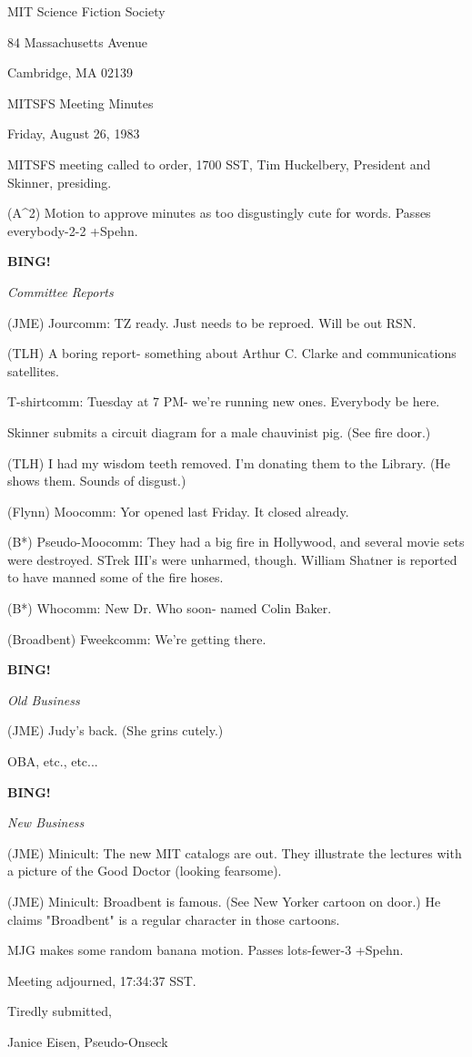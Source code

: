 \documentclass[12pt]{article}
\newcommand{\bing}{{\bf BING!} }
\newcommand{\goto}[1]{\bing \vskip 12pt \centerline{{\em{#1}}}}
\begin{document}
\begin{center}

MIT Science Fiction Society 

84 Massachusetts Avenue

Cambridge, MA 02139

\vspace{12pt}

MITSFS Meeting Minutes 

Friday, August 26, 1983

\end{center}
 
\vspace{18pt}

\setlength{\parskip}{6pt}

\noindent
MITSFS meeting called to order, 1700 SST,
Tim Huckelbery, President and Skinner, presiding.

(A^2) Motion to approve minutes as too disgustingly cute for words. Passes everybody-2-2 +Spehn.

\goto{Committee Reports}

(JME) Jourcomm: TZ ready. Just needs to be reproed. Will be out RSN.

(TLH) A boring report- something about Arthur C. Clarke and communications satellites.

T-shirtcomm: Tuesday at 7 PM- we're running new ones. Everybody be here.

Skinner submits a circuit diagram for a male chauvinist pig. (See fire door.)

(TLH) I had my wisdom teeth removed. I'm donating them to the Library. (He shows them. Sounds of disgust.)

(Flynn) Moocomm: Yor opened last Friday. It closed already.

(B*) Pseudo-Moocomm: They had a big fire in Hollywood, and several movie sets were destroyed. STrek III's were unharmed, though. William Shatner is reported to have manned some of the fire hoses.

(B*) Whocomm: New Dr. Who soon- named Colin Baker.

(Broadbent) Fweekcomm: We're getting there.

\goto{Old Business}

(JME) Judy's back. (She grins cutely.)

OBA, etc., etc...

\goto{New Business}

(JME) Minicult: The new MIT catalogs are out. They illustrate the lectures with a picture of the Good Doctor (looking fearsome).

(JME) Minicult: Broadbent is famous. (See New Yorker cartoon on door.) He claims "Broadbent" is a regular character in those cartoons.

MJG makes some random banana motion. Passes lots-fewer-3 +Spehn.

\vspace{12pt}

\noindent
Meeting adjourned, 17:34:37 SST.

\vspace{18pt}

\centerline{Tiredly submitted,}
\centerline{Janice Eisen, Pseudo-Onseck}
\end{document}
